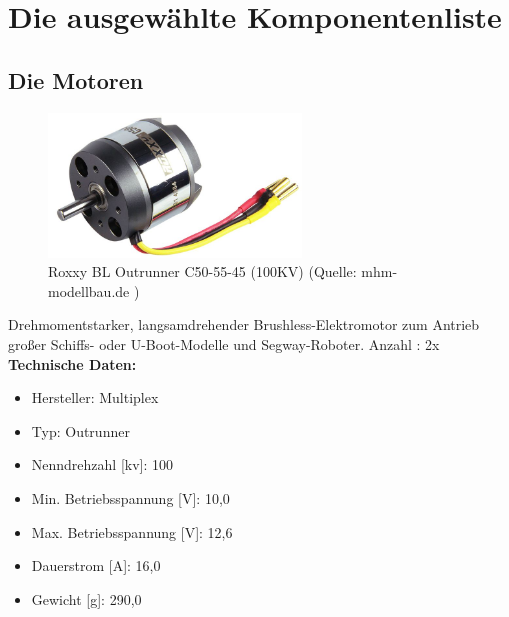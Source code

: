 \newpage
\renewcommand{\autoren}{alle}
\section{Die ausgewählte Komponentenliste}
\subsection{Die Motoren}
\begin{figure}[!h]  %
	\centering\includegraphics[width=0.6\textwidth]{images/Motor.jpg}
	\caption{Roxxy BL Outrunner C50-55-45 (100KV) \newline (Quelle: mhm-modellbau.de )}
	\label{Motor Roxxy}
\end{figure}
Drehmomentstarker, langsamdrehender Brushless-Elektromotor zum Antrieb großer Schiffs- oder U-Boot-Modelle und Segway-Roboter.
Anzahl : 2x
\textbf{Technische Daten:} 
\begin{itemize} 
	\item Hersteller: Multiplex 
	\item Typ: Outrunner
	\item Nenndrehzahl [kv]: 100
	\item Min. Betriebsspannung [V]: 10,0
	\item Max. Betriebsspannung [V]: 12,6
	\item Dauerstrom [A]: 16,0
	\item Gewicht [g]: 290,0
\end{itemize}
